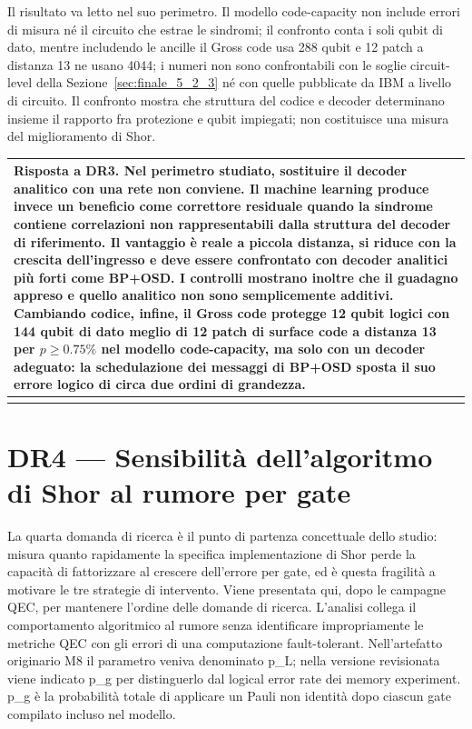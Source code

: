 Il risultato va letto nel suo perimetro. Il modello code-capacity non include errori di misura né il circuito che estrae le sindromi; il confronto conta i soli qubit di dato, mentre includendo le ancille il Gross code usa 288 qubit e 12 patch a distanza 13 ne usano 4044; i numeri non sono confrontabili con le soglie circuit-level della Sezione~\ref{sec:finale_5_2_3} né con quelle pubblicate da IBM a livello di circuito. Il confronto mostra che struttura del codice e decoder determinano insieme il rapporto fra protezione e qubit impiegati; non costituisce una misura del miglioramento di Shor.

{\def\LTcaptype{none} %
\begin{longtable}[]{@{}
  >{\raggedright\arraybackslash}p{}@{}}
\toprule\noalign{}
\begin{minipage}[b]{\linewidth}\raggedright
\textbf{Risposta a DR3.} Nel perimetro studiato, sostituire il decoder analitico con una rete non conviene. Il machine learning produce invece un beneficio come correttore residuale quando la sindrome contiene correlazioni non rappresentabili dalla struttura del decoder di riferimento. Il vantaggio è reale a piccola distanza, si riduce con la crescita dell'ingresso e deve essere confrontato con decoder analitici più forti come BP+OSD. I controlli mostrano inoltre che il guadagno appreso e quello analitico non sono semplicemente additivi. Cambiando codice, infine, il Gross code protegge 12 qubit logici con 144 qubit di dato meglio di 12 patch di surface code a distanza 13 per \(p \ge 0.75\%\) nel modello code-capacity, ma solo con un decoder adeguato: la schedulazione dei messaggi di BP+OSD sposta il suo errore logico di circa due ordini di grandezza.
\end{minipage} \\
\midrule\noalign{}
\endhead
\bottomrule\noalign{}
\endlastfoot
\end{longtable}
}

\section{DR4 --- Sensibilità dell'algoritmo di Shor al rumore per gate}\label{sec:finale_5_4}

La quarta domanda di ricerca è il punto di partenza concettuale dello studio: misura quanto rapidamente la specifica implementazione di Shor perde la capacità di fattorizzare al crescere dell'errore per gate, ed è questa fragilità a motivare le tre strategie di intervento. Viene presentata qui, dopo le campagne QEC, per mantenere l'ordine delle domande di ricerca. L'analisi collega il comportamento algoritmico al rumore senza identificare impropriamente le metriche QEC con gli errori di una computazione fault-tolerant. Nell'artefatto originario M8 il parametro veniva denominato p\_L; nella versione revisionata viene indicato p\_g per distinguerlo dal logical error rate dei memory experiment. p\_g è la probabilità totale di applicare un Pauli non identità dopo ciascun gate compilato incluso nel modello.

